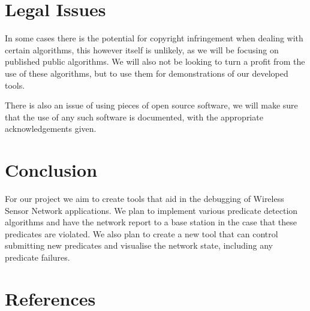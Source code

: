 \documentclass[a4paper]{article}
\begin{document}
\section{Legal Issues}
In some cases there is the potential for copyright infringement when dealing
with certain algorithms, this however itself is unlikely, as we will be focusing
on published public algorithms. We will also not be looking to turn a profit
from the use of these algorithms, but to use them for demonstrations of our
developed tools.

There is also an issue of using pieces of open source software, we will make
sure that the use of any such software is documented, with the appropriate
acknowledgements given.

\section{Conclusion}

For our project we aim to create tools that aid in the debugging of Wireless
Sensor Network applications. We plan to implement various predicate detection
algorithms and have the network report to a base station in the case that these
predicates are violated. We also plan to create a new tool that can control
submitting new predicates and visualise the network state, including any
predicate failures.

\clearpage

\appendixpage
\addappheadtotoc
\appendix


\section{References}
\renewcommand{\refname}{\vspace{-1cm}}


\end{document}
